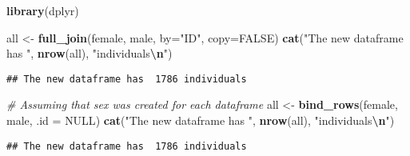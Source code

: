 \documentclass[
]{book}
\newenvironment{Shaded}{\begin{snugshade}}{\end{snugshade}}
\newcommand{\AttributeTok}[1]{\textcolor[rgb]{0.13,0.29,0.53}{#1}}
\newcommand{\CommentTok}[1]{\textcolor[rgb]{0.56,0.35,0.01}{\textit{#1}}}
\newcommand{\ConstantTok}[1]{\textcolor[rgb]{0.56,0.35,0.01}{#1}}
\newcommand{\FunctionTok}[1]{\textcolor[rgb]{0.13,0.29,0.53}{\textbf{#1}}}
\newcommand{\NormalTok}[1]{#1}
\newcommand{\OtherTok}[1]{\textcolor[rgb]{0.56,0.35,0.01}{#1}}
\newcommand{\SpecialCharTok}[1]{\textcolor[rgb]{0.81,0.36,0.00}{\textbf{#1}}}
\newcommand{\StringTok}[1]{\textcolor[rgb]{0.31,0.60,0.02}{#1}}
\begin{document}
\begin{Shaded}
\begin{Highlighting}[]
\FunctionTok{library}\NormalTok{(dplyr)}

\NormalTok{all }\OtherTok{\textless{}{-}} \FunctionTok{full\_join}\NormalTok{(female, male, }\AttributeTok{by=}\StringTok{"ID"}\NormalTok{, }\AttributeTok{copy=}\ConstantTok{FALSE}\NormalTok{)}
\FunctionTok{cat}\NormalTok{(}\StringTok{"The new dataframe has "}\NormalTok{, }\FunctionTok{nrow}\NormalTok{(all), }\StringTok{"individuals}\SpecialCharTok{\textbackslash{}n}\StringTok{"}\NormalTok{)}
\end{Highlighting}
\end{Shaded}

\begin{verbatim}
## The new dataframe has  1786 individuals
\end{verbatim}

\begin{Shaded}
\begin{Highlighting}[]
\CommentTok{\# Assuming that \textasciigrave{}sex\textasciigrave{} was created for each dataframe}
\NormalTok{all }\OtherTok{\textless{}{-}} \FunctionTok{bind\_rows}\NormalTok{(female, male, }\AttributeTok{.id =} \ConstantTok{NULL}\NormalTok{)}
\FunctionTok{cat}\NormalTok{(}\StringTok{"The new dataframe has "}\NormalTok{, }\FunctionTok{nrow}\NormalTok{(all), }\StringTok{"individuals}\SpecialCharTok{\textbackslash{}n}\StringTok{"}\NormalTok{)}
\end{Highlighting}
\end{Shaded}

\begin{verbatim}
## The new dataframe has  1786 individuals
\end{verbatim}
\end{document}
